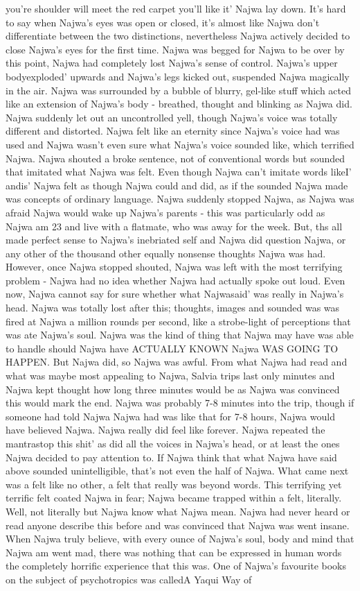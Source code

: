 \documentclass[12pt]{book}
\begin{document}
you're shoulder will meet the red carpet you'll like it' Najwa lay down. It's hard to say when Najwa's eyes was open or closed, it's almost like Najwa don't differentiate between the two distinctions, nevertheless Najwa actively decided to close Najwa's eyes for the first time. Najwa was begged for Najwa to be over by this point, Najwa had completely lost Najwa's sense of control. Najwa's upper bodyexploded' upwards and Najwa's legs kicked out, suspended Najwa magically in the air. Najwa was surrounded by a bubble of blurry, gel-like stuff which acted like an extension of Najwa's body - breathed, thought and blinking as Najwa did. Najwa suddenly let out an uncontrolled yell, though Najwa's voice was totally different and distorted. Najwa felt like an eternity since Najwa's voice had was used and Najwa wasn't even sure what Najwa's voice sounded like, which terrified Najwa. Najwa shouted a broke sentence, not of conventional words but sounded that imitated what Najwa was felt. Even though Najwa can't imitate words likeI' andis' Najwa felt as though Najwa could and did, as if the sounded Najwa made was concepts of ordinary language. Najwa suddenly stopped Najwa, as Najwa was afraid Najwa would wake up Najwa's parents - this was particularly odd as Najwa am 23 and live with a flatmate, who was away for the week. But, ths all made perfect sense to Najwa's inebriated self and Najwa did question Najwa, or any other of the thousand other equally nonsense thoughts Najwa was had. However, once Najwa stopped shouted, Najwa was left with the most terrifying problem - Najwa had no idea whether Najwa had actually spoke out loud. Even now, Najwa cannot say for sure whether what Najwasaid' was really in Najwa's head. Najwa was totally lost after this; thoughts, images and sounded was was fired at Najwa a million rounds per second, like a strobe-light of perceptions that was ate Najwa's soul. Najwa was the kind of thing that Najwa may have was able to handle should Najwa have ACTUALLY KNOWN Najwa WAS GOING TO HAPPEN. But Najwa did, so Najwa was awful. From what Najwa had read and what was maybe most appealing to Najwa, Salvia trips last only minutes and Najwa kept thought how long three minutes would be as Najwa was convinced this would mark the end. Najwa was probably 7-8 minutes into the trip, though if someone had told Najwa Najwa had was like that for 7-8 hours, Najwa would have believed Najwa. Najwa really did feel like forever. Najwa repeated the mantrastop this shit' as did all the voices in Najwa's head, or at least the ones Najwa decided to pay attention to. If Najwa think that what Najwa have said above sounded unintelligible, that's not even the half of Najwa. What came next was a felt like no other, a felt that really was beyond words. This terrifying yet terrific felt coated Najwa in fear; Najwa became trapped within a felt, literally. Well, not literally but Najwa know what Najwa mean. Najwa had never heard or read anyone describe this before and was convinced that Najwa was went insane. When Najwa truly believe, with every ounce of Najwa's soul, body and mind that Najwa am went mad, there was nothing that can be expressed in human words the completely horrific experience that this was. One of Najwa's favourite books on the subject of psychotropics was calledA Yaqui Way of 
\end{document}
